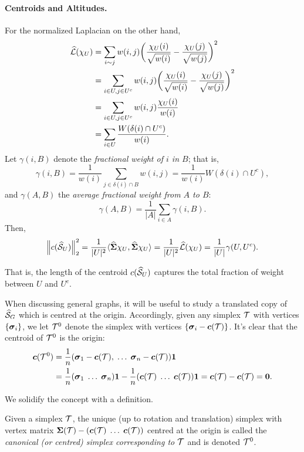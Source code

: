 \paragraph{Centroids and Altitudes.}
For the normalized Laplacian on the other hand,
\begin{align}
\widehat{\mathcal{L}}(\chi_U)&=\sum_{i\sim j}w(i,j) \bigg(\frac{\chi_U(i)}{\sqrt{w(i)}}-\frac{\chi_U(j)}{\sqrt{w(j)}}\bigg)^2 \notag \\
&= \sum_{i\in U,j\in U^c}w(i,j)\bigg(\frac{\chi_U(i)}{\sqrt{w(i)}}-\frac{\chi_U(j)}{\sqrt{w(j)}}\bigg)^2 \notag \\
&= \sum_{i\in U,j\in U^c}w(i,j)\frac{\chi_U(i)}{w(i)} \notag \\
&= \sum_{i\in U}\frac{W(\delta(i)\cap U^c)}{w(i)}. \label{eq:Lnf(chiU)}
\end{align}
Let $\gamma(i,B)$ denote the \emph{fractional weight of $i$ in $B$}; that is, \[\gamma(i,B)=\frac{1}{w(i)}\sum_{j\in\delta(i)\cap B} w(i,j)=\frac{1}{w(i)}W(\delta(i)\cap U^c),\]
and $\gamma(A,B)$ the \emph{average fractional weight from $A$ to $B$}: 
\[\gamma(A,B) =\frac{1}{|A|}\sum_{i\in A}\gamma(i,B). \]
Then, 
\begin{equation*}
\norm{c(\widehat{\mathcal{S}}_U)}_2^2 = \frac{1}{|U|^2}\langle \widehat{\boldsymbol{\Sigma}}\chi_U,\widehat{\boldsymbol{\Sigma}}\chi_U\rangle = \frac{1}{|U|^2}\widehat{\mathcal{L}}(\chi_U) = \frac{1}{|U|} \gamma(U,U^c).
\end{equation*}


That is, the length of the centroid $c(\widehat{\mathcal{S}}_U)$ captures the total fraction of weight between $U$ and $U^c$. 


When discussing general graphs, it will be useful to study a  translated copy of $\widehat{\mathcal{S}}_G$ which is centred at the origin. Accordingly, given any simplex $\mathcal{T}$ with vertices $\{\vb*{\sigma}_i\}$, we let $\mathcal{T}^0$ denote the simplex with vertices $\{\vb*{\sigma}_i - \vb*{c}(\mathcal{T})\}$. It's clear that the centroid of $\mathcal{T}^0$ is the origin: 
\begin{align*}
\vb*{c}(\mathcal{T}^0) 
&= \frac{1}{n}(\vb*{\sigma}_1-\vb*{c}(\mathcal{T}),\;\dots\;\vb*{\sigma}_n-\vb*{c}(\mathcal{T}))\vb{1} \\
&= \frac{1}{n}(\vb*{\sigma}_1\;\dots\;\vb*{\sigma}_n)\vb{1} - \frac{1}{n}(\vb*{c}(\mathcal{T})\;\dots\;\vb*{c}(\mathcal{T}))\vb{1} = \vb*{c}(\mathcal{T}) - \vb*{c}(\mathcal{T})=\vb{0}.
\end{align*}

We solidify the concept with a definition. 

\begin{definition}
	Given a simplex $\mathcal{T}$, the unique (up to rotation and translation) simplex with vertex matrix $\boldsymbol{\Sigma}(\mathcal{T}) - (\vb*{c}(\mathcal{T})\;\dots\;\vb*{c}(\mathcal{T}))$ centred at the origin is called the \emph{canonical (or centred) simplex corresponding to $\mathcal{T}$} and is denoted $\mathcal{T}^0$. 
\end{definition}

